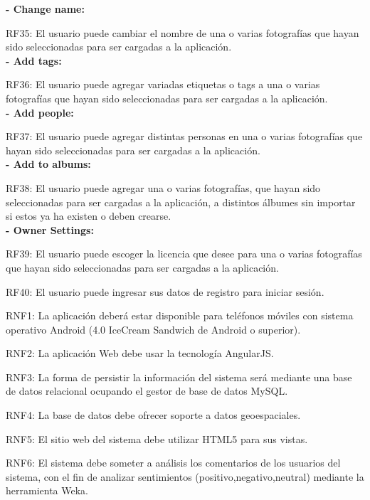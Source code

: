 \documentclass{memoria}
\begin{document}
\textbf{- Change name:}

RF35: El usuario puede cambiar el nombre de una o varias fotografías que hayan sido seleccionadas para ser cargadas a la aplicación.\\

\textbf{- Add tags:}

RF36: El usuario puede agregar variadas etiquetas o tags a una o varias fotografías que hayan sido seleccionadas para ser cargadas a la aplicación.\\

\textbf{- Add people:}

RF37: El usuario puede agregar distintas personas en una o varias fotografías que hayan sido seleccionadas para ser cargadas a la aplicación.\\

\textbf{- Add to albums:}

RF38: El usuario puede agregar una o varias fotografías, que hayan sido seleccionadas para ser cargadas a la aplicación, a distintos álbumes sin importar si estos ya ha existen o deben crearse.\\

\textbf{- Owner Settings:}

RF39: El usuario puede escoger la licencia que desee para una o varias fotografías que hayan sido seleccionadas para ser cargadas a la aplicación.\\


RF40: El usuario puede ingresar sus datos de registro para iniciar sesión.\\

\newpage


RNF1: La aplicación deberá estar disponible para teléfonos móviles con sistema operativo Android (4.0 IceCream Sandwich de Android o superior).

RNF2: La aplicación Web debe usar la tecnología AngularJS.

RNF3: La forma de persistir la información del sistema será mediante una base de datos relacional ocupando el gestor de base de datos MySQL.

RNF4: La base de datos debe ofrecer soporte a datos geoespaciales.

RNF5: El sitio web del sistema debe utilizar HTML5 para sus vistas.

RNF6: El sistema debe someter a análisis los comentarios de los usuarios del sistema, con el fin de analizar sentimientos (positivo,negativo,neutral) mediante la herramienta Weka.
\end{document}

